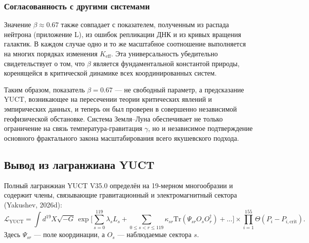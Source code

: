 \documentclass[12pt]{article}
\theoremstyle{remark}
\newcommand{\lagr}{\mathcal{L}}
\begin{document}
	\subsubsection{Согласованность с другими системами}
	Значение $\beta \approx 0.67$ также совпадает с показателем, полученным из распада нейтрона (приложение L), из ошибок репликации ДНК и из кривых вращения галактик. В каждом случае одно и то же масштабное соотношение выполняется на многих порядках изменения $K_{\mathrm{eff}}$. Эта универсальность убедительно свидетельствует о том, что $\beta$ является фундаментальной константой природы, коренящейся в критической динамике всех координированных систем.
	
	Таким образом, показатель $\beta = 0.67$ — не свободный параметр, а предсказание YUCT, возникающее на пересечении теории критических явлений и эмпирических данных, и теперь он был проверен в совершенно независимой геофизической обстановке. Система Земля–Луна обеспечивает не только ограничение на связь температура-гравитация $\gamma$, но и независимое подтверждение основного фрактального закона масштабирования всего якушевского подхода.
	
	\subsection{Вывод из лагранжиана YUCT}
	\label{subsec:lagrangian-derivation}
	
	Полный лагранжиан YUCT V35.0 определён на 19-мерном многообразии и содержит члены, связывающие гравитационный и электромагнитный сектора (Yakushev, 2026d):
	\begin{equation}
		\lagr_{\text{YUCT}} = \int d^{19}X \sqrt{-G} \, 
		\exp\Bigg[ \sum_{s=0}^{119} \lambda_s L_s + \sum_{0\le s<r\le119} \kappa_{sr} \mathrm{Tr}(\Psi_{sr} O_s O_r^\dagger) + \dots \Bigg]
		\times \prod_{i=1}^{155} \Theta(P_i - P_{i,\text{crit}}).
		\label{eq:lagrangian-full}
	\end{equation}
	Здесь $\Psi_{sr}$ — поле координации, а $O_s$ — наблюдаемые сектора $s$.
	
\end{document}
